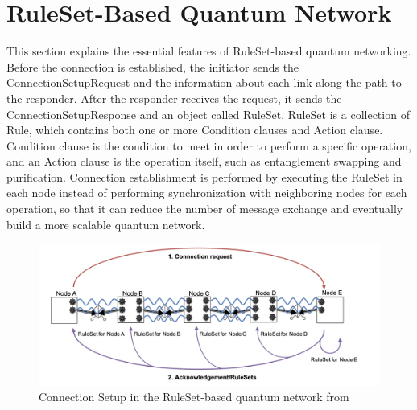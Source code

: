 \section{RuleSet-Based Quantum Network}

This section explains the essential features of RuleSet-based quantum networking. Before the connection is established, the initiator sends the ConnectionSetupRequest and the information about each link along the path to the responder.
After the responder receives the request, it sends the ConnectionSetupResponse and an object called RuleSet.
RuleSet is a collection of Rule, which contains both one or more Condition clauses and Action clause. Condition clause is the condition to meet in order to perform a specific operation, and an Action clause is the operation itself, such as entanglement swapping and purification.
Connection establishment is performed by executing the RuleSet in each node instead of performing synchronization with neighboring nodes for each operation, so that it can reduce the number of message exchange and eventually build a more scalable quantum network.

\begin{figure}[H]
  \centerline{\includegraphics[width=.5\columnwidth]{images/ruleset_connection.png}}
  \caption{Connection Setup in the RuleSet-based quantum network from \cite{matsuo2019simulation}}
\end{figure}



